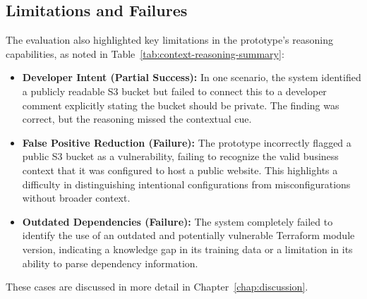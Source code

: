 \subsection{Limitations and Failures}
The evaluation also highlighted key limitations in the prototype's reasoning capabilities, as noted in Table~\ref{tab:context-reasoning-summary}:
\begin{itemize}
    \item \textbf{Developer Intent (Partial Success):} In one scenario, the system identified a publicly readable S3 bucket but failed to connect this to a developer comment explicitly stating the bucket should be private. The finding was correct, but the reasoning missed the contextual cue.
    \item \textbf{False Positive Reduction (Failure):} The prototype incorrectly flagged a public S3 bucket as a vulnerability, failing to recognize the valid business context that it was configured to host a public website. This highlights a difficulty in distinguishing intentional configurations from misconfigurations without broader context.
    \item \textbf{Outdated Dependencies (Failure):} The system completely failed to identify the use of an outdated and potentially vulnerable Terraform module version, indicating a knowledge gap in its training data or a limitation in its ability to parse dependency information.
\end{itemize}
These cases are discussed in more detail in Chapter~\ref{chap:discussion}.




